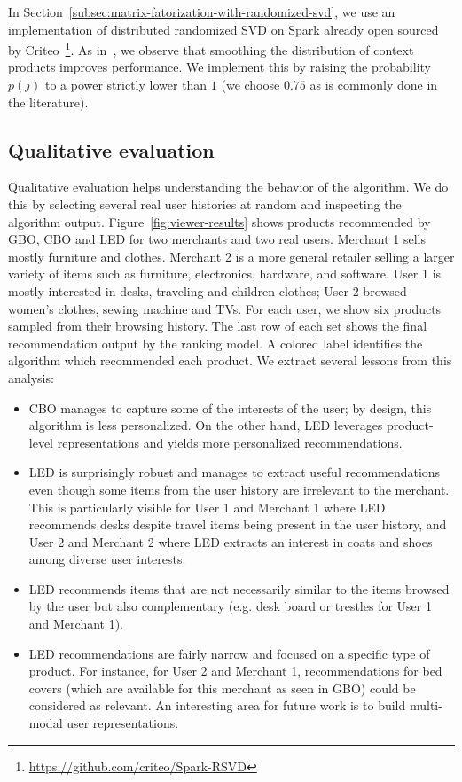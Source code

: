 \documentclass[sigconf]{acmart}
\begin{document}
In Section~\ref{subsec:matrix-fatorization-with-randomized-svd}, we use an implementation of distributed randomized SVD on Spark already open sourced by Criteo~\footnote{\url{https://github.com/criteo/Spark-RSVD}}. As in~\cite{levy2015improving}, we observe that smoothing the distribution of context products improves performance. We implement this by raising the probability $p(j)$ to a power strictly lower than $1$ (we choose $0.75$ as is commonly done in the literature).

\subsection{Qualitative evaluation}

Qualitative evaluation helps understanding the behavior of the algorithm. We do this by selecting several real user histories at random and inspecting the algorithm output. Figure~\ref{fig:viewer-results} shows products recommended by GBO, CBO and LED for two merchants and two real users. Merchant 1 sells mostly furniture and clothes. Merchant 2 is a more general retailer selling a larger variety of items such as furniture, electronics, hardware, and software. User 1 is mostly interested in desks, traveling and children clothes; User 2 browsed women's clothes, sewing machine and TVs. For each user, we show six products sampled from their browsing history. The last row of each set shows the final recommendation output by the ranking model. A colored label identifies the algorithm which recommended each product. We extract several lessons from this analysis:

\begin{itemize}
    \item CBO manages to capture some of the interests of the user; by design, this algorithm is less personalized. On the other hand, LED leverages product-level representations and yields more personalized recommendations.
    \item LED is surprisingly robust and manages to extract useful recommendations even though some items from the user history are irrelevant to the merchant. This is particularly visible for User 1 and Merchant 1 where LED recommends desks despite travel items being present in the user history, and User 2 and Merchant 2 where LED extracts an interest in coats and shoes among diverse user interests.
    \item LED recommends items that are not necessarily similar to the items browsed by the user but also complementary (e.g. desk board or trestles for User 1 and Merchant 1).
    \item LED recommendations are fairly narrow and focused on a specific type of product. For instance, for User 2 and Merchant 1, recommendations for bed covers (which are available for this merchant as seen in GBO) could be considered as relevant. An interesting area for future work is to build multi-modal user representations.
\end{itemize}
\end{document}

